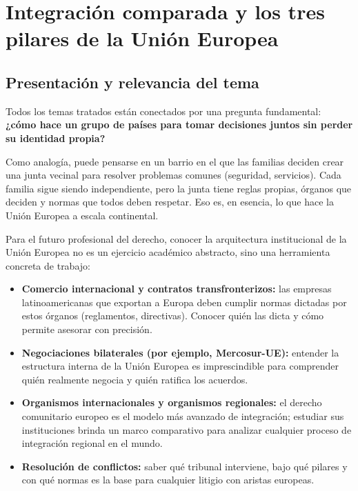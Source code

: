 \documentclass[12pt,oneside]{book}
\begin{document}
\frontmatter
\tableofcontents
\mainmatter

\chapter[Integración comparada y pilares de la UE]{Integración comparada y los tres pilares de la Unión Europea}

\section{Presentación y relevancia del tema}

Todos los temas tratados están conectados por una pregunta fundamental: \textbf{¿cómo hace un grupo de países para tomar decisiones juntos sin perder su identidad propia?}

Como analogía, puede pensarse en un barrio en el que las familias deciden crear una junta vecinal para resolver problemas comunes (seguridad, servicios). Cada familia sigue siendo independiente, pero la junta tiene reglas propias, órganos que deciden y normas que todos deben respetar. Eso es, en esencia, lo que hace la Unión Europea a escala continental.

Para el futuro profesional del derecho, conocer la arquitectura institucional de la Unión Europea no es un ejercicio académico abstracto, sino una herramienta concreta de trabajo:

\begin{itemize}
    \item \textbf{Comercio internacional y contratos transfronterizos:} las empresas latinoamericanas que exportan a Europa deben cumplir normas dictadas por estos órganos (reglamentos, directivas). Conocer quién las dicta y cómo permite asesorar con precisión.
    \item \textbf{Negociaciones bilaterales (por ejemplo, Mercosur-UE):} entender la estructura interna de la Unión Europea es imprescindible para comprender quién realmente negocia y quién ratifica los acuerdos.
    \item \textbf{Organismos internacionales y organismos regionales:} el derecho comunitario europeo es el modelo más avanzado de integración; estudiar sus instituciones brinda un marco comparativo para analizar cualquier proceso de integración regional en el mundo.
    \item \textbf{Resolución de conflictos:} saber qué tribunal interviene, bajo qué pilares y con qué normas es la base para cualquier litigio con aristas europeas.
\end{itemize}
\end{document}
